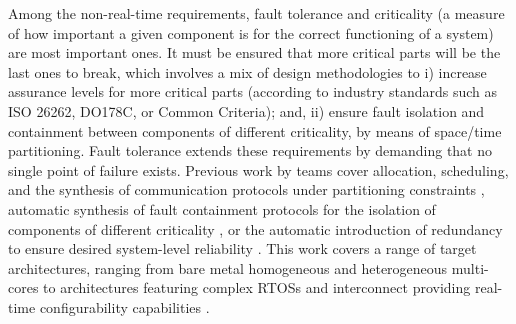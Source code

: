 \documentclass[a4paper,11pt]{article}
\begin{document}
%
Among the non-real-time requirements, fault tolerance and criticality
(a measure of how important a given component is for the correct
functioning of a system) are most important ones. It must be ensured
that more critical parts will be the last ones to break, which 
involves a mix of design methodologies to i) increase assurance
levels for more critical parts (according to industry standards such
as ISO 26262, DO178C, or Common Criteria); and, ii) ensure fault
isolation and containment between components of different
criticality, by means of space/time partitioning. Fault tolerance
extends these requirements by demanding that no single point of
failure exists. Previous work by \INRIA teams cover allocation, 
scheduling, and the synthesis of communication protocols under 
partitioning constraints \cite{lopht1}, automatic
synthesis of fault containment protocols for the isolation of
components of different criticality \cite{erts2}, or the automatic
introduction of redundancy to ensure desired system-level reliability
\cite{tolerant}.
%
%
This work covers a range of target architectures, ranging from bare 
metal homogeneous and heterogeneous multi-cores\cite{erts2,lopht3} 
to architectures featuring complex
RTOSs and interconnect providing real-time configurability
capabilities \cite{lopht1}.
\end{document}
